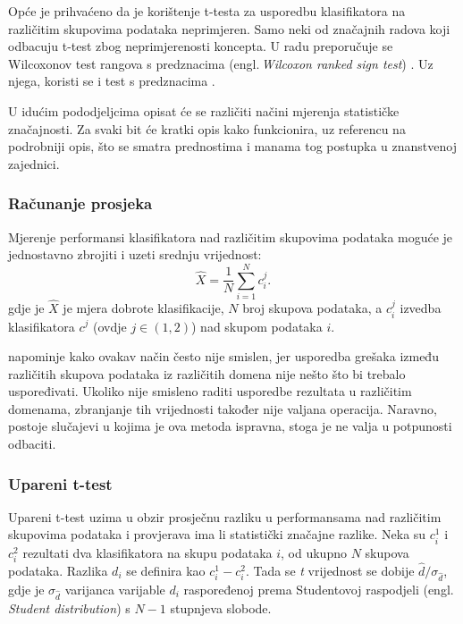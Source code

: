 Opće je prihvaćeno da je korištenje t-testa za usporedbu klasifikatora na različitim skupovima podataka neprimjeren. Samo neki od značajnih radova koji odbacuju t-test zbog neprimjerenosti koncepta. U radu \citep{demvsar2006statistical} preporučuje se Wilcoxonov test rangova s predznacima (engl.\,\textit{Wilcoxon ranked sign test}) \citep{wilcoxon1945individual}. Uz njega, koristi se i test s predznacima \cite{dixon1946statistical}. 

U idućim pododjeljcima opisat će se različiti načini mjerenja statističke značajnosti. Za svaki bit će kratki opis kako funkcionira, uz referencu na podrobniji opis, što se smatra prednostima i manama tog postupka u znanstvenoj zajednici.

\subsubsection{Računanje prosjeka}

Mjerenje performansi klasifikatora nad različitim skupovima podataka moguće je jednostavno zbrojiti i uzeti srednju vrijednost:
\begin{equation}
\hat{X} = \frac{1}{N} \sum^{N}_{i = 1} c_{i}^{j}. 
\end{equation}
gdje je $\hat{X}$ je mjera dobrote klasifikacije, $N$ broj skupova podataka, a $c_{i}^{j}$ izvedba klasifikatora $c^j$ (ovdje $j\in (1,2)$) nad skupom podataka $i$.

\citep{webb2000multiboosting} napominje kako ovakav način često nije smislen, jer usporedba grešaka između različitih skupova podataka iz različitih domena nije nešto što bi trebalo uspoređivati. Ukoliko nije smisleno raditi usporedbe rezultata u različitim domenama, zbranjanje tih vrijednosti također nije valjana operacija. Naravno, postoje slučajevi u kojima je ova metoda ispravna, stoga je ne valja u potpunosti odbaciti.

\subsubsection{Upareni t-test}

Upareni t-test \citep{sprinthall1990basic} uzima u obzir prosječnu razliku u performansama nad različitim skupovima podataka i provjerava ima li statistički značajne razlike. Neka su $c^{1}_{i}$ i $c^{2}_{i}$ rezultati dva klasifikatora na skupu podataka $i$, od ukupno $N$ skupova podataka. Razlika $d_i$ se definira kao $c^{1}_{i} - c^{2}_{i}$. Tada se \textit{t} vrijednost se dobije $\hat{d}/\sigma_{\hat{d}}$, gdje je $\sigma_ {\hat{d}}$ varijanca varijable $d_i$ raspoređenoj prema Studentovoj raspodjeli (engl.\,\textit{Student distribution}) s $N-1$ stupnjeva slobode. 

